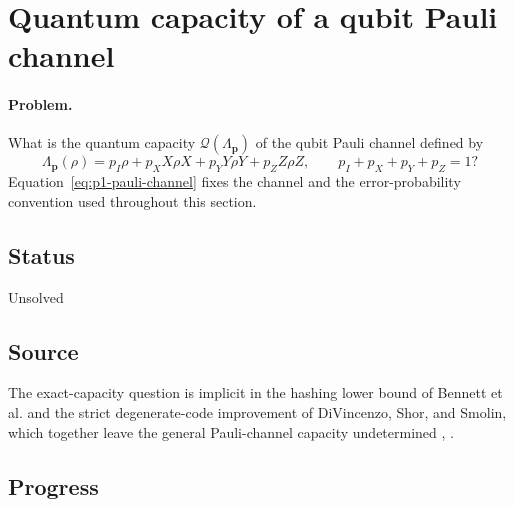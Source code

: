 \section{Quantum capacity of a qubit Pauli channel}
\label{sec:problem-1}

\paragraph{Problem.}
What is the quantum capacity $\mathcal{Q}(\Lambda_{\mathbf p})$ of the qubit
Pauli channel defined by
\begin{equation}
  \Lambda_{\mathbf p}(\rho)
  =p_I\rho+p_XX\rho X+p_YY\rho Y+p_ZZ\rho Z,
  \qquad p_I+p_X+p_Y+p_Z=1?
  \label{eq:p1-pauli-channel}
\end{equation}
Equation~\eqref{eq:p1-pauli-channel} fixes the channel and the error-probability
convention used throughout this section.

\subsection*{Status}

Unsolved

\subsection*{Source}

The exact-capacity question is implicit in the hashing lower bound of Bennett
et al. and the strict degenerate-code improvement of DiVincenzo, Shor, and
Smolin, which together leave the general Pauli-channel capacity undetermined
,
.

\subsection*{Progress}

